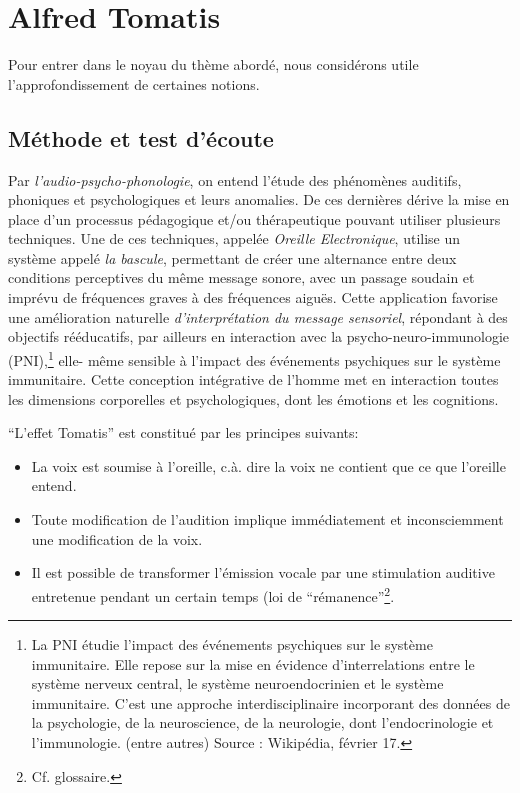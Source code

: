 \chapter{Alfred Tomatis}


Pour entrer dans le noyau du thème abordé, nous considérons utile
l'approfondissement de certaines notions.
\section{Méthode et test d'écoute}

Par {\textit{l'audio-psycho-phonologie}}, on entend l'étude des
phénomènes auditifs, phoniques et psychologiques et leurs anomalies.
De ces dernières dérive la mise en place d'un processus pédagogique
et/ou thérapeutique pouvant 
utiliser plusieurs techniques.
Une de ces techniques,
  appelée
\label{outil_oreille_electro}
\textit{Oreille Electronique}, utilise 
un système appelé \textit{ la 
bascule}, permettant de créer une alternance entre deux conditions perceptives 
du même message sonore, avec un passage soudain et imprévu de fréquences graves à des 
fréquences aiguës.
Cette application favorise une amélioration naturelle \emph{d'interprétation du message
sensoriel}, répondant à des objectifs rééducatifs, par ailleurs en
interaction avec la psycho-neuro-immunologie (PNI),\footnote{La PNI étudie 
l'impact des événements psychiques sur le système immunitaire. Elle repose sur 
la mise en évidence d'interrelations entre le système
nerveux central, le système neuroendocrinien et le système immunitaire.
C'est une approche interdisciplinaire incorporant des données de la
psychologie, de la neuroscience, de la neurologie, dont l'endocrinologie
et l'immunologie. (entre autres) Source : Wikipédia, février 17.}
elle- même sensible à
l'impact des événements psychiques sur le système immunitaire.
Cette
conception intégrative de l'homme met en interaction toutes les
dimensions corporelles et psychologiques, dont les émotions et les cognitions.


``L'effet Tomatis'' est constitué par les principes suivants:  
\begin{itemize}
	\item La voix est soumise à l'oreille, c.à. dire la voix ne contient que ce que l'oreille entend.
	\item Toute modification de l'audition implique immédiatement
          et inconsciemment une
          modification de la voix.
	\item Il est possible de transformer l'émission vocale par une stimulation 
auditive
		entretenue pendant un certain temps (loi de
               ``\gls{rémanence}''\footnote{Cf. glossaire.}. 
 
\end{itemize}

